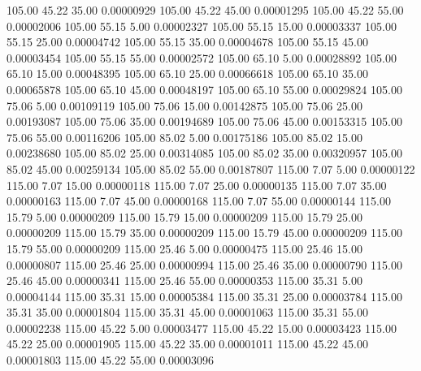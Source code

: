     105.00     45.22     35.00     0.00000929
    105.00     45.22     45.00     0.00001295
    105.00     45.22     55.00     0.00002006
    105.00     55.15      5.00     0.00002327
    105.00     55.15     15.00     0.00003337
    105.00     55.15     25.00     0.00004742
    105.00     55.15     35.00     0.00004678
    105.00     55.15     45.00     0.00003454
    105.00     55.15     55.00     0.00002572
    105.00     65.10      5.00     0.00028892
    105.00     65.10     15.00     0.00048395
    105.00     65.10     25.00     0.00066618
    105.00     65.10     35.00     0.00065878
    105.00     65.10     45.00     0.00048197
    105.00     65.10     55.00     0.00029824
    105.00     75.06      5.00     0.00109119
    105.00     75.06     15.00     0.00142875
    105.00     75.06     25.00     0.00193087
    105.00     75.06     35.00     0.00194689
    105.00     75.06     45.00     0.00153315
    105.00     75.06     55.00     0.00116206
    105.00     85.02      5.00     0.00175186
    105.00     85.02     15.00     0.00238680
    105.00     85.02     25.00     0.00314085
    105.00     85.02     35.00     0.00320957
    105.00     85.02     45.00     0.00259134
    105.00     85.02     55.00     0.00187807
    115.00      7.07      5.00     0.00000122
    115.00      7.07     15.00     0.00000118
    115.00      7.07     25.00     0.00000135
    115.00      7.07     35.00     0.00000163
    115.00      7.07     45.00     0.00000168
    115.00      7.07     55.00     0.00000144
    115.00     15.79      5.00     0.00000209
    115.00     15.79     15.00     0.00000209
    115.00     15.79     25.00     0.00000209
    115.00     15.79     35.00     0.00000209
    115.00     15.79     45.00     0.00000209
    115.00     15.79     55.00     0.00000209
    115.00     25.46      5.00     0.00000475
    115.00     25.46     15.00     0.00000807
    115.00     25.46     25.00     0.00000994
    115.00     25.46     35.00     0.00000790
    115.00     25.46     45.00     0.00000341
    115.00     25.46     55.00     0.00000353
    115.00     35.31      5.00     0.00004144
    115.00     35.31     15.00     0.00005384
    115.00     35.31     25.00     0.00003784
    115.00     35.31     35.00     0.00001804
    115.00     35.31     45.00     0.00001063
    115.00     35.31     55.00     0.00002238
    115.00     45.22      5.00     0.00003477
    115.00     45.22     15.00     0.00003423
    115.00     45.22     25.00     0.00001905
    115.00     45.22     35.00     0.00001011
    115.00     45.22     45.00     0.00001803
    115.00     45.22     55.00     0.00003096
